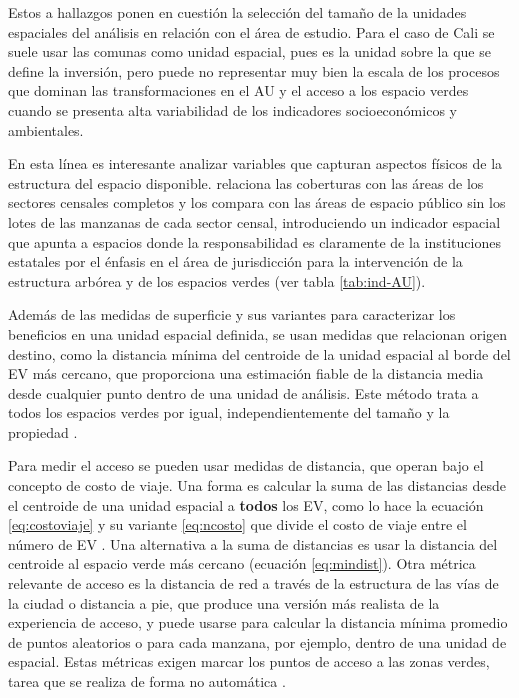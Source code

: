\documentclass[12pt,]{book}
\begin{document}
Estos a hallazgos ponen en cuestión la selección del tamaño de la
unidades espaciales del análisis en relación con el área de estudio.
Para el caso de Cali se suele usar las comunas como unidad espacial,
pues es la unidad sobre la que se define la inversión, pero puede no
representar muy bien la escala de los procesos que dominan las
transformaciones en el AU y el acceso a los espacio verdes cuando se
presenta alta variabilidad de los indicadores socioeconómicos y
ambientales.

En esta línea es interesante analizar variables que capturan aspectos
físicos de la estructura del espacio disponible.
\citep{landry_street_2009} relaciona las coberturas con las áreas de los
sectores censales completos y los compara con las áreas de espacio
público sin los lotes de las manzanas de cada sector censal,
introduciendo un indicador espacial que apunta a espacios donde la
responsabilidad es claramente de la instituciones estatales por el
énfasis en el área de jurisdicción para la intervención de la estructura
arbórea y de los espacios verdes (ver tabla \ref{tab:ind-AU}).

Además de las medidas de superficie y sus variantes para caracterizar
los beneficios en una unidad espacial definida, se usan medidas que
relacionan origen destino, como la distancia mínima del centroide de la
unidad espacial al borde del EV más cercano, que proporciona una
estimación fiable de la distancia media desde cualquier punto dentro de
una unidad de análisis. Este método trata a todos los espacios verdes
por igual, independientemente del tamaño y la propiedad
\citep{nesbitt_exploring_2016}.

Para medir el acceso se pueden usar medidas de distancia, que operan
bajo el concepto de costo de viaje. Una forma es calcular la suma de las
distancias desde el centroide de una unidad espacial a \textbf{todos}
los EV, como lo hace la ecuación \eqref{eq:costoviaje} y su variante
\eqref{eq:ncosto} que divide el costo de viaje entre el número de EV
\citep{talen_assessing_1998}. Una alternativa a la suma de distancias es
usar la distancia del centroide al espacio verde más cercano (ecuación
\eqref{eq:mindist}). Otra métrica relevante de acceso es la distancia de
red a través de la estructura de las vías de la ciudad o distancia a
pie, que produce una versión más realista de la experiencia de acceso, y
puede usarse para calcular la distancia mínima promedio de puntos
aleatorios o para cada manzana, por ejemplo, dentro de una unidad de
espacial. Estas métricas exigen marcar los puntos de acceso a las zonas
verdes, tarea que se realiza de forma no automática
\citep{zhou_social_2013}.
\end{document}
